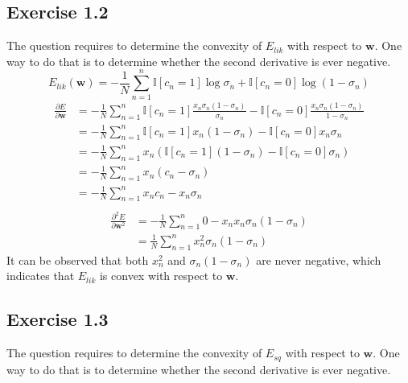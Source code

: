 \documentclass[fleqn]{article}
\renewcommand{\vec}[1]{\mathbf{#1}}
\begin{document}
\subsection*{Exercise 1.2}
The question requires to determine the convexity of $E_{lik}$ with respect to $\vec{w}$. One way to do that is to determine whether the second derivative is ever negative.
\begin{equation}
    E_{lik} (\vec{w}) =
    - \frac{1}{N} \sum_{n=1}^n
    \mathbb{I}[c_n = 1] \log \sigma_n
    + \mathbb{I}[c_n = 0] \log \left ( 1 - \sigma_n \right )
\end{equation}
\begin{equation}
    \begin{split}
        \frac{\partial E}{\partial \vec{w}} & =
        - \frac{1}{N} \sum_{n=1}^n
        \mathbb{I}[c_n = 1]
        \frac{x_n \sigma_n (1 - \sigma_n)}{\sigma_n}
        - \mathbb{I}[c_n = 0]
        \frac{x_n \sigma_n (1 - \sigma_n)}{1 - \sigma_n} \\
        & = - \frac{1}{N} \sum_{n=1}^n
        \mathbb{I}[c_n = 1]
        x_n (1 - \sigma_n)
        - \mathbb{I}[c_n = 0]
        x_n \sigma_n  \\
        & = - \frac{1}{N} \sum_{n=1}^n
        x_n \left ( \mathbb{I} [c_n = 1]
        (1 - \sigma_n)
        - \mathbb{I}[c_n = 0]
        \sigma_n \right ) \\
        & = - \frac{1}{N} \sum_{n=1}^n
        x_n ( c_n - \sigma_n ) \\
        & = - \frac{1}{N} \sum_{n=1}^n
        x_n c_n - x_n \sigma_n \\
    \end{split}
\end{equation}
\begin{equation}
    \begin{split}
        \frac{\partial ^2 E}{\partial \vec{w}^2} & = 
        - \frac{1}{N} \sum_{n=1}^n
        0 - x_n x_n \sigma_n (1 - \sigma_n) \\
        & = \frac{1}{N} \sum_{n=1}^n
        x_n^2 \sigma_n (1 - \sigma_n)
    \end{split}
\end{equation}
It can be observed that both $x_n^2$ and $\sigma_n (1 - \sigma_n)$ are never negative, which indicates that $E_{lik}$ is convex with respect to $\vec{w}$.

\subsection*{Exercise 1.3}
The question requires to determine the convexity of $E_{sq}$ with respect to $\vec{w}$. One way to do that is to determine whether the second derivative is ever negative.
\end{document}
